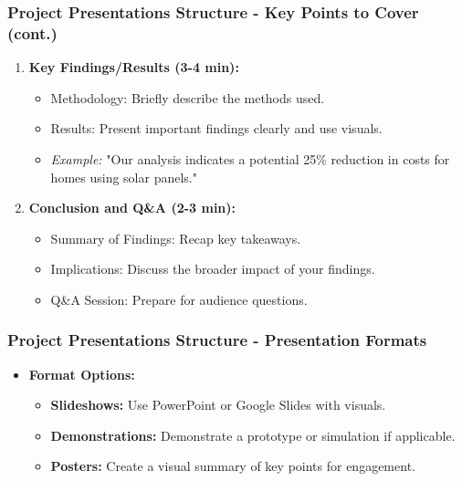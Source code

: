 \documentclass[aspectratio=169]{beamer}
\begin{document}
\begin{frame}[fragile]
    \frametitle{Project Presentations Structure - Key Points to Cover (cont.)}
    \begin{enumerate}[resume]
        \item \textbf{Key Findings/Results (3-4 min):}
            \begin{itemize}
                \item Methodology: Briefly describe the methods used.
                \item Results: Present important findings clearly and use visuals.
                
                \item \textit{Example:} "Our analysis indicates a potential 25\% reduction in costs for homes using solar panels."
            \end{itemize}

        \item \textbf{Conclusion and Q\&A (2-3 min):}
            \begin{itemize}
                \item Summary of Findings: Recap key takeaways.
                \item Implications: Discuss the broader impact of your findings.
                \item Q\&A Session: Prepare for audience questions.
            \end{itemize}
    \end{enumerate}
\end{frame}

\begin{frame}[fragile]
    \frametitle{Project Presentations Structure - Presentation Formats}
    \begin{itemize}
        \item \textbf{Format Options:}
            \begin{itemize}
                \item \textbf{Slideshows:} Use PowerPoint or Google Slides with visuals.
                \item \textbf{Demonstrations:} Demonstrate a prototype or simulation if applicable.
                \item \textbf{Posters:} Create a visual summary of key points for engagement.
            \end{itemize}
    \end{itemize}
\end{frame}
\end{document}
